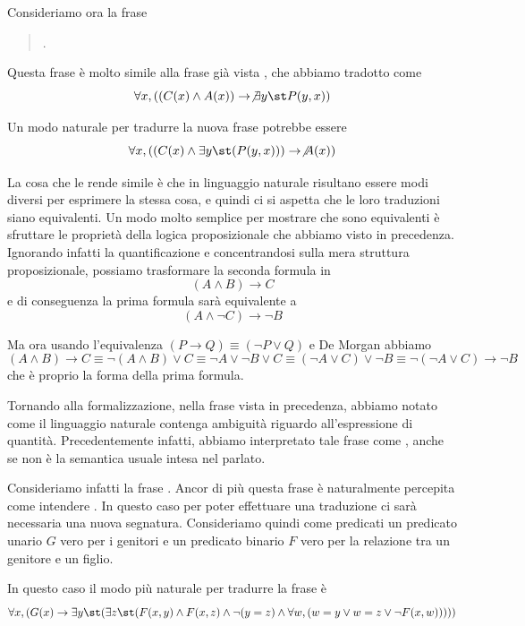 Consideriamo ora la frase 
\begin{quote}
  .
\end{quote}

Questa frase è molto simile alla frase già vista , che abbiamo tradotto come
\[\forall x, ((C(x) \land A(x)) \to \not\exists y\st P(y,x))\]

Un modo naturale per tradurre la nuova frase potrebbe essere
\[\forall x, ((C(x) \land \exists y\st( P(y,x) )) \to \not A(x))\]

La cosa che le rende simile è che in linguaggio naturale risultano essere modi diversi per esprimere la stessa cosa, e quindi ci si aspetta che le loro traduzioni siano equivalenti. Un modo molto semplice per mostrare che sono equivalenti è sfruttare le proprietà della logica proposizionale che abbiamo visto in precedenza. Ignorando infatti la quantificazione e concentrandosi sulla mera struttura proposizionale, possiamo trasformare la seconda formula in
\[(A \land B )\to C\]
e di conseguenza la prima formula sarà equivalente a
\[(A \land \neg C) \to \neg B\]

Ma ora usando l'equivalenza \((P \to Q) \equiv (\neg P \lor Q)\) e De Morgan abbiamo
\[(A \land B )\to C\equiv \neg (A \land B) \lor C\equiv \neg A \lor \neg B \lor C \equiv (\neg A \lor C) \lor \neg B \equiv \neg (\neg A \lor C) \to \neg B \]
che è proprio la forma della prima formula.

Tornando alla formalizzazione, nella frase vista in precedenza,  abbiamo notato come il linguaggio naturale contenga ambiguità riguardo all'espressione di quantità. Precedentemente infatti, abbiamo interpretato tale frase come , anche se non è la semantica usuale intesa nel parlato.

Consideriamo infatti la frase . Ancor di più questa frase è naturalmente percepita come intendere . In questo caso per poter effettuare una traduzione ci sarà necessaria una nuova segnatura. Consideriamo quindi come predicati un predicato unario \(G\) vero per i genitori e un predicato binario \(F\) vero per la relazione tra un genitore e un figlio.

In questo caso il modo più naturale per tradurre la frase è
\[\forall x,( G(x) \to \exists y \st(\exists z\st (F(x,y) \land F(x,z) \land \neg(y = z) \land \forall w, (w = y \lor w = z \lor \neg F(x,w)))))\]

